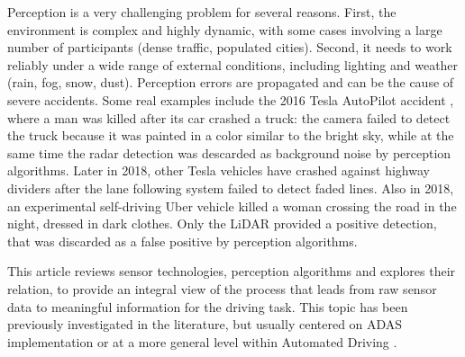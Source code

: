 Perception is a very challenging problem for several
reasons. First, the environment is complex and highly dynamic, with some cases
involving a large number of participants (dense traffic, populated cities). 
Second, it needs to work reliably under a wide range of external conditions, 
including lighting and weather (rain, fog, snow, dust). 
Perception errors are propagated and can be the cause of severe accidents. 
Some real examples include the 2016 Tesla AutoPilot accident \cite{NTSB2017},
where a man was killed after its car crashed a truck: 
the camera failed to detect the truck because
it was painted in a color similar to the bright sky, while at the same time 
the radar detection was descarded as background noise by perception algorithms.
Later in 2018, other Tesla vehicles have crashed against highway dividers
after the lane following system failed to detect faded lines.
Also in 2018, an experimental self-driving Uber vehicle killed a woman
crossing the road \cite{NTSB2018} in the night, dressed in dark clothes. 
Only the LiDAR provided a positive detection, that was discarded as a false
positive by perception algorithms.

This article reviews sensor technologies, perception algorithms and explores
their relation, to provide an integral view of the process that leads from raw
sensor data to meaningful information for the driving task.
This topic has been previously investigated in the literature, but usually
centered on ADAS implementation \cite{Yenkanchi2016,Ziebinski2016a} or at a
more general level within Automated Driving \cite{Pendleton2017}. 


